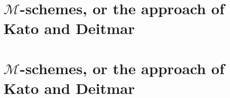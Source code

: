 \iftex
\section{\texorpdfstring{$\mathcal{M}$}{M}-schemes, or the approach of Kato and Deitmar}
\fi
\ifblog
\section{$\mathcal{M}$-schemes, or the approach of Kato and Deitmar}
\fi

